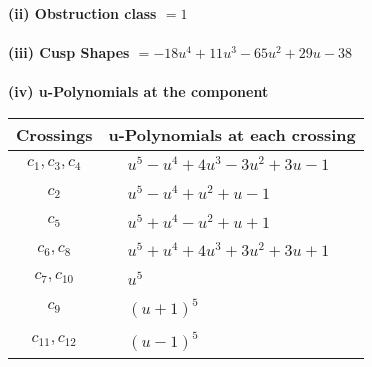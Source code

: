 \documentclass[1p]{elsarticle_modified}
\theoremstyle{definition}
\begin{document}
\flushleft \textbf{(ii) Obstruction class $= 1$}\\~\\
\flushleft \textbf{(iii) Cusp Shapes $= -18 u^4+11 u^3-65 u^2+29 u-38$}\\~\\
\newpage\renewcommand{\arraystretch}{1}
\flushleft \textbf{(iv) u-Polynomials at the component}\newline \\
\begin{tabular}{m{50pt}|m{274pt}}
Crossings & \hspace{64pt}u-Polynomials at each crossing \\
\hline $$\begin{aligned}c_{1},c_{3},c_{4}\end{aligned}$$&$\begin{aligned}
&u^5- u^4+4 u^3-3 u^2+3 u-1
\end{aligned}$\\
\hline $$\begin{aligned}c_{2}\end{aligned}$$&$\begin{aligned}
&u^5- u^4+u^2+u-1
\end{aligned}$\\
\hline $$\begin{aligned}c_{5}\end{aligned}$$&$\begin{aligned}
&u^5+u^4- u^2+u+1
\end{aligned}$\\
\hline $$\begin{aligned}c_{6},c_{8}\end{aligned}$$&$\begin{aligned}
&u^5+u^4+4 u^3+3 u^2+3 u+1
\end{aligned}$\\
\hline $$\begin{aligned}c_{7},c_{10}\end{aligned}$$&$\begin{aligned}
&u^5
\end{aligned}$\\
\hline $$\begin{aligned}c_{9}\end{aligned}$$&$\begin{aligned}
&(u+1)^5
\end{aligned}$\\
\hline $$\begin{aligned}c_{11},c_{12}\end{aligned}$$&$\begin{aligned}
&(u-1)^5
\end{aligned}$\\
\hline
\end{tabular}\\~\\
\end{document}
